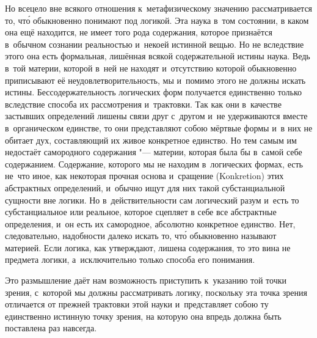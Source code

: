 Но всецело вне всякого отношения к~метафизическому значению рассматривается
то, чт\'{о} обыкновенно понимают под логикой. Эта наука в~том состоянии, в
каком она ещё находится, не имеет того рода содержания, которое признаётся
в~обычном сознании реальностью и~некоей истинной вещью. Но не вследствие
этого она есть формальная, лишённая всякой содержательной истины наука.
Ведь в~той материи, которой в~ней не находят и~отсутствию которой
обыкновенно приписывают её неудовлетворительность, мы и~помимо этого не
должны искать истины. Бессодержательность логических форм получается
единственно только вследствие способа их рассмотрения и~трактовки. Так как
они в~качестве застывших определений лишены связи друг с~другом и~не
удерживаются вместе в~органическом единстве, то они представляют собою
мёртвые формы и~в них не обитает дух, составляющий их живое конкретное
единство. Но тем самым им недостаёт самородного содержания "--- материи,
которая была бы в~самой себе содержанием. Содержание, которого мы не
находим в~логических формах, есть не~что иное, как некоторая прочная основа
и~сращение (Konkretion) этих абстрактных определений, и~обычно ищут для них
такой субстанциальной сущности вне логики. Но в~действительности сам
логический разум и~есть то субстанциальное или реальное, которое сцепляет в
себе все абстрактные определения, и~он есть их самородное, абсолютно
конкретное единство. Нет, следовательно, надобности далеко искать то, чт\'{о}
обыкновенно называют материей. Если логика, как утверждают, лишена
содержания, то это вина не предмета логики, а~исключительно только способа
его понимания.

Это размышление даёт нам возможность приступить к~указанию той точки зрения,
с~которой мы должны рассматривать логику, поскольку эта точка зрения
отличается от прежней трактовки этой науки и~представляет собою ту
единственно истинную точку зрения, на которую она впредь должна быть
поставлена раз навсегда.

